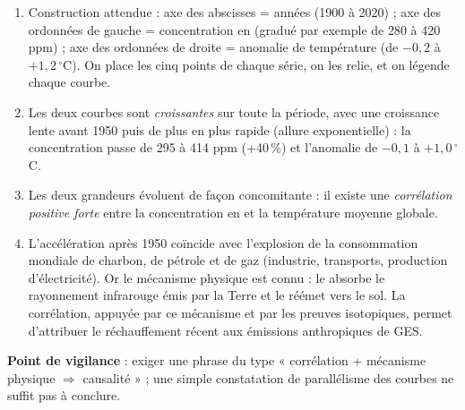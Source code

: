 \documentclass[11pt]{article}
\begin{document}
\begin{corrige}
\begin{enumerate}
    \item Construction attendue : axe des abscisses = années (1900 à 2020) ; axe des ordonnées de gauche = concentration en  (gradué par exemple de 280 à 420 ppm) ; axe des ordonnées de droite = anomalie de température (de $-0{,}2$ à $+1{,}2\,^\circ$C). On place les cinq points de chaque série, on les relie, et on légende chaque courbe.
    \item Les deux courbes sont \emph{croissantes} sur toute la période, avec une croissance lente avant 1950 puis de plus en plus rapide (allure exponentielle) : la concentration passe de 295 à 414 ppm (+40\,\%) et l'anomalie de $-0{,}1$ à $+1{,}0\,^\circ$C.
    \item Les deux grandeurs évoluent de façon concomitante : il existe une \emph{corrélation positive forte} entre la concentration en  et la température moyenne globale.
    \item L'accélération après 1950 coïncide avec l'explosion de la consommation mondiale de charbon, de pétrole et de gaz (industrie, transports, production d'électricité). Or le mécanisme physique est connu : le  absorbe le rayonnement infrarouge émis par la Terre et le réémet vers le sol. La corrélation, appuyée par ce mécanisme et par les preuves isotopiques, permet d'attribuer le réchauffement récent aux émissions anthropiques de GES.
\end{enumerate}
\textbf{Point de vigilance} : exiger une phrase du type « corrélation + mécanisme physique $\Rightarrow$ causalité » ; une simple constatation de parallélisme des courbes ne suffit pas à conclure.
\end{corrige}
\end{document}
